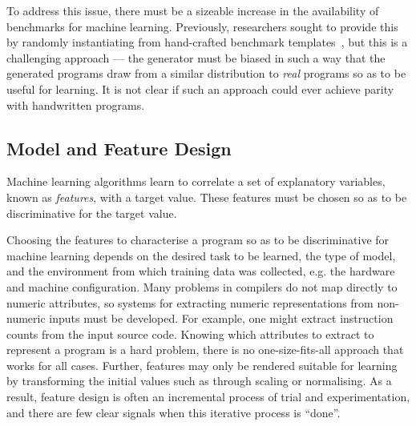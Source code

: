 To address this issue, there must be a sizeable increase in the availability of benchmarks for machine learning. Previously, researchers sought to provide this by randomly instantiating from hand-crafted benchmark templates~\cite{Chiu2015}, but this is a challenging approach --- the generator must be biased in such a way that the generated programs draw from a similar distribution to \emph{real} programs so as to be useful for learning. It is not clear if such an approach could ever achieve parity with handwritten programs.

\subsection{Model and Feature Design}
\label{subsec:challenge-features}

Machine learning algorithms learn to correlate a set of explanatory variables, known as \emph{features}, with a target value. These features must be chosen so as to be discriminative for the target value.

Choosing the features to characterise a program so as to be discriminative for machine learning  depends on the desired task to be learned, the type of model, and the environment from which training data was collected, e.g. the hardware and machine configuration. Many problems in compilers do not map directly to numeric attributes, so systems for extracting numeric representations from non-numeric inputs must be developed. For example, one might extract instruction counts from the input source code. Knowing which attributes to extract to represent a program is a hard problem, there is no one-size-fits-all approach that works for all cases. Further, features may only be rendered suitable for learning by transforming the initial values such as through scaling or normalising. As a result, feature design is often an incremental process of trial and experimentation, and there are few clear signals when this iterative process is ``done''.


